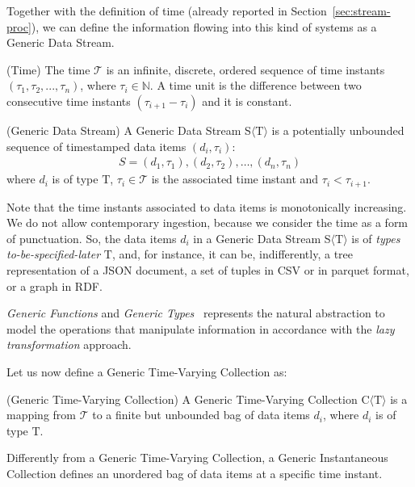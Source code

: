 Together with the definition of time (already reported in Section~\ref{sec:stream-proc}), we can define the information flowing into this kind of systems as a Generic Data Stream.

\begin{Definition}
(Time) The time $\mathcal{T}$ is an infinite, discrete, ordered sequence of time instants $(\tau_1,\tau_2,..., \tau_n)$, where $\tau_i \in \mathbb{N}$. A time unit is the difference between two consecutive time instants $(\tau_{i+1} - \tau_i)$ and it is constant.
\end{Definition}

\begin{Definition}
(Generic Data Stream) A Generic Data Stream S$\langle\mathrm{T}\rangle$ is a potentially unbounded sequence of timestamped data items $(d_i,\tau_i)$:
\noindent\begin{align*}
S = (d_1,\tau_1), (d_2,\tau_2), \ldots, (d_n,\tau_n)
\end{align*}  
where $d_i$ is of type $\mathrm{T}$, $\tau_i \in \mathcal{T}$ is the associated time instant and $\tau_i<\tau_{i+1}$.
\end{Definition}

Note that the time instants associated to data items is monotonically increasing. We do not allow contemporary ingestion, because we consider the time as a form of punctuation. 
So, the data items $d_i$ in a Generic Data Stream S$\langle\mathrm{T}\rangle$ is of \textit{types to-be-specified-later} $\mathrm{T}$, and, for instance, it can be, indifferently, a tree representation of a JSON document, a set of tuples in CSV or in parquet format, or a graph in RDF.

\textit{Generic Functions} and \textit{Generic Types}~\cite{DBLP:conf/dagstuhl/1998gp} represents the natural abstraction to model the operations that manipulate information in accordance with the \textit{lazy transformation} approach. 

Let us now define a Generic Time-Varying Collection as:

\begin{Definition}
(Generic Time-Varying Collection) A Generic Time-Varying Collection C$\langle\mathrm{T}\rangle$ is a mapping from $\mathcal{T}$ to a finite but unbounded bag of data items $d_i$, where $d_i$ is of type $\mathrm{T}$. 
\end{Definition}

Differently from a Generic Time-Varying Collection, a Generic Instantaneous Collection defines an unordered bag of data items at a specific time instant.

